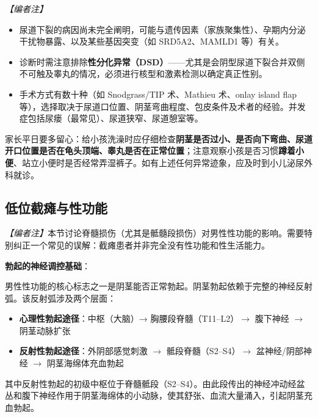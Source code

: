 \documentclass[12pt,a4paper,twoside]{ctexbook}
\begin{document}
\vspace{0.3em}
\noindent\textit{【编者注】}
\begin{itemize}
	\item 尿道下裂的病因尚未完全阐明，可能与遗传因素（家族聚集性）、孕期内分泌干扰物暴露、以及某些基因突变（如 SRD5A2、MAMLD1 等）有关。
	\item 诊断时需注意排除\textbf{性分化异常（DSD）}——尤其是会阴型尿道下裂合并双侧不可触及睾丸的情况，必须进行核型和激素检测以确定真正性别。
	\item 手术方式有数十种（如 Snodgrass/TIP 术、Mathieu 术、onlay island flap 等），选择取决于尿道口位置、阴茎弯曲程度、包皮条件及术者的经验。并发症包括尿瘘（最常见）、尿道狭窄、尿道憩室等。
\end{itemize}

\begin{tcolorbox}[colback=pink!5!white,colframe=red!50!black,title=贴心小叮咛]
家长平日要多留心：给小孩洗澡时应仔细检查\textbf{阴茎是否过小、是否向下弯曲、尿道开口位置是否在龟头顶端、睾丸是否在正常位置}；注意观察小孩是否习惯\textbf{蹲着小便}、站立小便时是否经常弄湿裤子。如有上述任何异常迹象，应及时到小儿泌尿外科就诊。
\end{tcolorbox}

\subsection{低位截瘫与性功能}

\noindent\textit{【编者注】}本节讨论脊髓损伤（尤其是骶髓段损伤）对男性性功能的影响。需要特别纠正一个常见的误解：截瘫患者并非完全没有性功能和性生活能力。

\vspace{0.5em}
\noindent\textbf{勃起的神经调控基础}：

男性性功能的核心标志之一是阴茎能否正常勃起。阴茎勃起依赖于完整的神经反射弧。该反射弧涉及两个层面：
\begin{itemize}
	\item \textbf{心理性勃起途径}：中枢（大脑）→ 胸腰段脊髓（T11--L2）$\rightarrow$ 腹下神经 $\rightarrow$ 阴茎动脉扩张
	\item \textbf{反射性勃起途径}：外阴部感觉刺激 $\rightarrow$ 骶段脊髓（S2--S4）$\rightarrow$ 盆神经/阴部神经 $\rightarrow$ 阴茎海绵体充血勃起
\end{itemize}

其中反射性勃起的初级中枢位于脊髓骶段（S2--S4）。由此段传出的神经冲动经盆丛和腹下神经作用于阴茎海绵体的小动脉，使其舒张、血流大量涌入，引起阴茎充血勃起。
\end{document}
